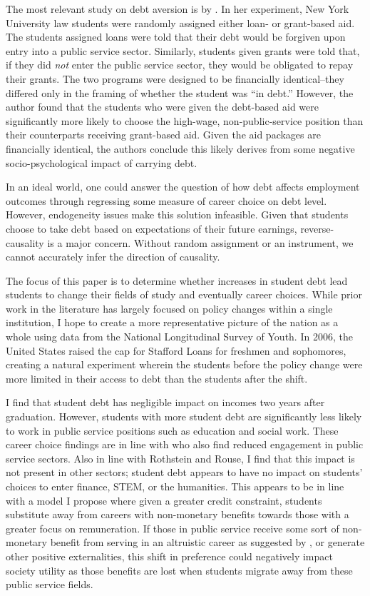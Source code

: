 \documentclass[12pt]{article}
\begin{document}
	The most relevant study on debt aversion is by \textcite{field2009}. In her experiment, New York University law students were randomly assigned either loan- or grant-based aid. The students assigned loans were told that their debt would be forgiven upon entry into a public service sector. Similarly, students given grants were told that, if they did \emph{not} enter the public service sector, they would be obligated to repay their grants. The two programs were designed to be financially identical--they differed only in the framing of whether the student was ``in debt.'' However, the author found that the students who were given the debt-based aid were significantly more likely to choose the high-wage, non-public-service position than their counterparts receiving grant-based aid. Given the aid packages are financially identical, the authors conclude this likely derives from some negative socio-psychological impact of carrying debt.
	
	In an ideal world, one could answer the question of how debt affects employment outcomes through regressing some measure of career choice on debt level. However, endogeneity issues make this solution infeasible. Given that students choose to take debt based on expectations of their future earnings, reverse-causality is a major concern. Without random assignment or an instrument, we cannot accurately infer the direction of causality. 
	
	The focus of this paper is to determine whether increases in student debt lead students to change their fields of study and eventually career choices. While prior work in the literature has largely focused on policy changes within a single institution, I hope to create a more representative picture of the nation as a whole using data from the National Longitudinal Survey of Youth. In 2006, the United States raised the cap for Stafford Loans for freshmen and sophomores, creating a natural experiment wherein the students before the policy change were more limited in their access to debt than the students after the shift.
	
	I find that student debt has negligible impact on incomes two years after graduation. However, students with more student debt are significantly less likely to work in public service positions such as education and social work. These career choice findings are in line with \textcite{rothstein2011} who also find reduced engagement in public service sectors. Also in line with Rothstein and Rouse, I find that this impact is not present in other sectors; student debt appears to have no impact on students' choices to enter finance, STEM, or the humanities. This appears to be in line with a model I propose where given a greater credit constraint, students substitute away from careers with non-monetary benefits towards those with a greater focus on remuneration. If those in public service receive some sort of non-monetary benefit from serving in an altruistic career as suggested by \textcite{hanson1995}, or generate other positive externalities, this shift in preference could negatively impact society utility as those benefits are lost when students migrate away from these public service fields.
	
\end{document}

